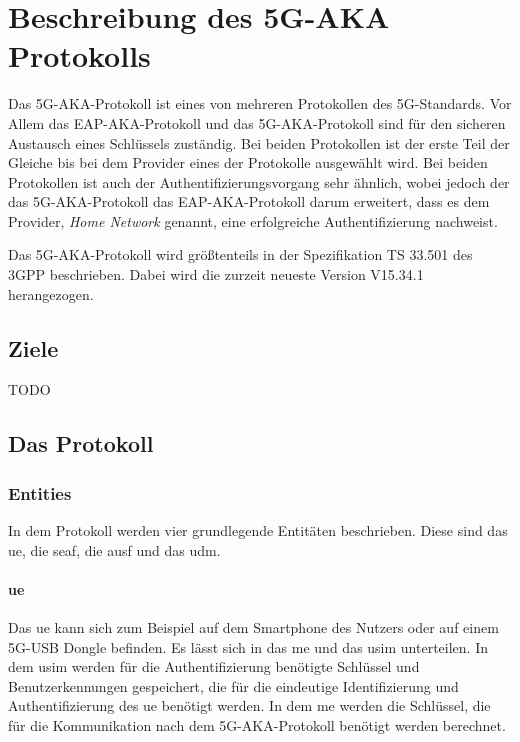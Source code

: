 \chapter{Beschreibung des 5G-AKA Protokolls}
\label{chap:2}

Das 5G-AKA-Protokoll ist eines von mehreren Protokollen des 5G-Standards.
Vor Allem das EAP-AKA-Protokoll und das 5G-AKA-Protokoll sind f\"ur den sicheren Austausch eines Schl\"ussels zust\"andig. 
Bei beiden Protokollen ist der erste Teil der Gleiche bis bei dem Provider eines der Protokolle ausgew\"ahlt wird. %
Bei beiden Protokollen ist auch der Authentifizierungsvorgang sehr \"ahnlich, wobei jedoch der das 5G-AKA-Protokoll das EAP-AKA-Protokoll darum erweitert, dass es dem Provider, \textit{Home Network} genannt, eine erfolgreiche Authentifizierung nachweist. %

Das 5G-AKA-Protokoll wird gr\"o{\ss}tenteils in der Spezifikation TS 33.501 des 3GPP beschrieben. %
Dabei wird die zurzeit neueste Version V15.34.1 herangezogen.

\section{Ziele}

TODO

\section{Das Protokoll}

\subsection{Entities}%

In dem Protokoll werden vier grundlegende Entit\"aten beschrieben.
Diese sind das \gls{ue}, die \gls{seaf}, die \gls{ausf} und das \gls{udm}.

\subsubsection{\gls{ue}}

Das \gls{ue} kann sich zum Beispiel auf dem Smartphone des Nutzers oder auf einem 5G-USB Dongle befinden.
Es l\"asst sich in das \gls{me} und das \gls{usim} unterteilen.
In dem \gls{usim} werden f\"ur die Authentifizierung ben\"otigte Schl\"ussel und Benutzerkennungen gespeichert, die f\"ur die eindeutige Identifizierung und Authentifizierung des \gls{ue} ben\"otigt werden. %
In dem \gls{me} werden die Schl\"ussel, die f\"ur die Kommunikation nach dem 5G-AKA-Protokoll ben\"otigt werden berechnet.

